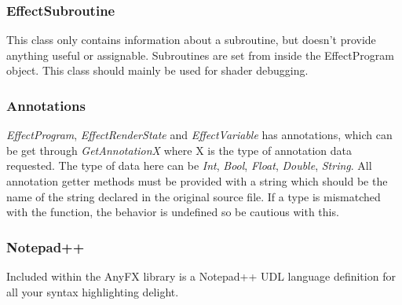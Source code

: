 \documentclass{article}
\begin{document}
\subsubsection{EffectSubroutine}
This class only contains information about a subroutine, but doesn't provide anything useful or assignable. Subroutines are set from inside the EffectProgram object. This class should mainly be used for shader debugging.

\subsubsection{Annotations}
\textit{EffectProgram}, \textit{EffectRenderState} and \textit{EffectVariable} has annotations, which can be get through \textit{GetAnnotationX} where X is the type of annotation data requested. The type of data here can be \textit{Int}, \textit{Bool}, \textit{Float}, \textit{Double}, \textit{String}. All annotation getter methods must be provided with a string which should be the name of the string declared in the original source file. If a type is mismatched with the function, the behavior is undefined so be cautious with this. 

\subsubsection{Notepad++}
Included within the AnyFX library is a Notepad++ UDL language definition for all your syntax highlighting delight. 
\end{document}
